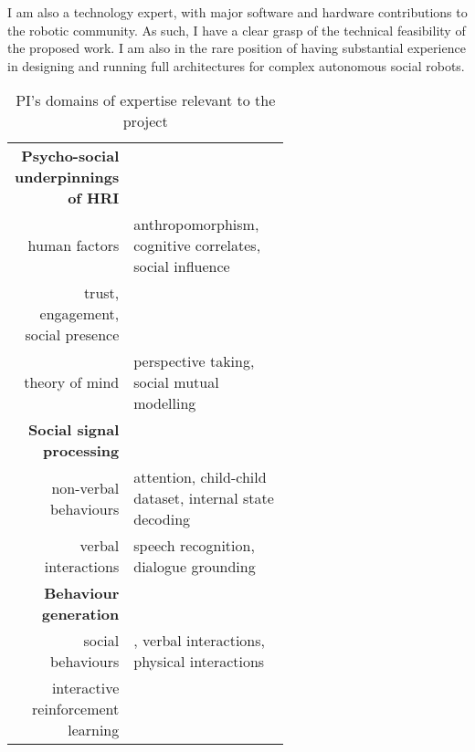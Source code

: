 I am also a technology expert, with major software and hardware contributions to
the robotic community. As such, I have a clear grasp of the technical
feasibility of the proposed work. I am also in the rare position of having
substantial experience in designing and running full architectures for complex
autonomous social
robots.

\begin{table}[h]
    \centering
    \caption{\small PI's domains of expertise relevant to the \project project}
    \begin{tabular}{rp{0.6\linewidth}}
        \toprule
        \textbf{Psycho-social underpinnings of HRI} \\  
        human factors & \small anthropomorphism\cite{lemaignan2014dynamics}, cognitive
        correlates\cite{lemaignan2014cognitive}, social influence\cite{winkle2019effective} \\
        trust, engagement, social presence & \small \cite{flook2019impact}\cite{lemaignan2015youre}\cite{fink2014which}\cite{irfan2018social}\cite{wijnen2020performing} \\
        theory of mind & \small perspective taking\cite{ros2010which, warnier2012when}, social mutual modelling\cite{lemaignan2015mutual,dillenbourg2016symmetry} \\
        \midrule
        \textbf{Social signal processing}\\
        non-verbal behaviours & \small attention\cite{lemaignan2016realtime},
        child-child dataset\cite{lemaignan2018pinsoro}, internal state decoding\cite{bartlett2019what} \\
        verbal interactions & \small speech recognition\cite{kennedy2017child}, dialogue grounding\cite{lemaignan2011grounding} \\
        \midrule
        \textbf{Behaviour generation} \\
        social behaviours & \small \cite{lallee2011towards}, verbal interactions\cite{wallbridge2019generating, wallbridge2019towards}, physical interactions\cite{gharbi2013natural} \\
        interactive reinforcement learning & \small
        \cite{senft2017leveraging,senft2017supervised, senft2019teaching,  winkle2020insitu} \\

\end{tabular}
\end{table}
